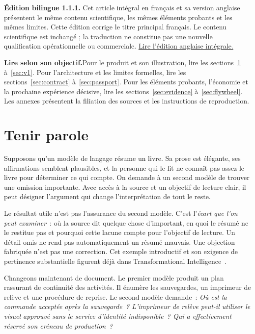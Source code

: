 \documentclass[11pt,a4paper]{article}
\newcommand{\ti}{Transformational Intelligence}
\newcommand{\chapterpage}{\clearpage}
\begin{document}
\chapterpage
\begingroup
\small
\setlength{\parskip}{2pt}
\tableofcontents
\endgroup
\vspace{5mm}
\noindent\textbf{Édition bilingue 1.1.1.} Cet article intégral en français et sa version anglaise présentent le même contenu scientifique, les mêmes éléments probants et les mêmes limites. Cette édition corrige le titre principal français. Le contenu scientifique est inchangé ; la traduction ne constitue pas une nouvelle qualification opérationnelle ou commerciale. \href{https://montrealai.github.io/AGI-Alpha-Invention-Flywheel-Lab/continuity-omega.html}{Lire l’édition anglaise intégrale.}

\begin{scopebox}
\textbf{Lire selon son objectif.}\enspace Pour le produit et son illustration, lire les sections~\ref{sec:promise} à~\ref{sec:v1}. Pour l’architecture et les limites formelles, lire les sections~\ref{sec:contract} à~\ref{sec:passport}. Pour les éléments probants, l’économie et la prochaine expérience décisive, lire les sections~\ref{sec:evidence} à~\ref{sec:flywheel}. Les annexes présentent la filiation des sources et les instructions de reproduction.
\end{scopebox}

\chapterpage
\section{Tenir parole}\label{sec:promise}
Supposons qu’un modèle de langage résume un livre. Sa prose est élégante, ses affirmations semblent plausibles, et la personne qui le lit ne connaît pas assez le livre pour déterminer ce qui compte. On demande à un second modèle de trouver une omission importante. Avec accès à la source et un objectif de lecture clair, il peut désigner l’argument qui change l’interprétation de tout le reste.

Le résultat utile n’est pas l’assurance du second modèle. C’est l’\emph{écart que l’on peut examiner}~: où la source dit quelque chose d’important, en quoi le résumé ne le restitue pas et pourquoi cette lacune compte pour l’objectif de lecture. Un détail omis ne rend pas automatiquement un résumé mauvais. Une objection fabriquée n’est pas une correction. Cet exemple introductif et son exigence de pertinence substantielle figurent déjà dans \ti\ \cite{boucherTI}.

Changeons maintenant de document. Le premier modèle produit un plan rassurant de continuité des activités. Il énumère les sauvegardes, un imprimeur de relève et une procédure de reprise. Le second modèle demande~: \emph{Où est la commande acceptée après la sauvegarde~? L’imprimeur de relève peut-il utiliser le visuel approuvé sans le service d’identité indisponible~? Qui a effectivement réservé son créneau de production~?}
\end{document}
